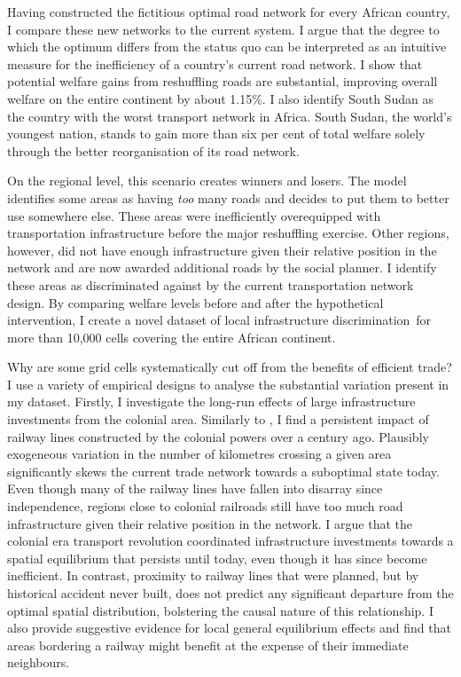 \documentclass[11pt, oneside]{article}   	%
\begin{document}
Having constructed the fictitious optimal road network for every African country, I compare these new networks to the current system. I argue that the degree to which the optimum differs from the status quo can be interpreted as an intuitive measure for the inefficiency of a country's current road network. I show that potential welfare gains from reshuffling roads are substantial, improving overall welfare on the entire continent by about 1.15\%. I also identify South Sudan as the country with the worst transport network in Africa. South Sudan, the world's youngest nation, stands to gain more than six per cent of total welfare solely through the better reorganisation of its road network.

On the regional level, this scenario creates winners and losers. The model identifies some areas as having \emph{too} many roads and decides to put them to better use somewhere else. These areas were inefficiently overequipped with transportation infrastructure before the major reshuffling exercise. Other regions, however, did not have enough infrastructure given their relative position in the network and are now awarded additional roads by the social planner. I identify these areas as discriminated against by the current transportation network design. By comparing welfare levels before and after the hypothetical intervention, I create a novel dataset of local infrastructure discrimination for more than 10,000 cells covering the entire African continent.

Why are some grid cells systematically cut off from the benefits of efficient trade? I use a variety of empirical designs to analyse the substantial variation present in my dataset. Firstly, I investigate the long-run effects of large infrastructure investments from the colonial area. Similarly to \cite{Jedwab_PermanentEffectsTransportation_2016a}, I find a persistent impact of railway lines constructed by the colonial powers over a century ago. Plausibly exogeneous variation in the number of kilometres crossing a given area significantly skews the current trade network towards a suboptimal state today. Even though many of the railway lines have fallen into disarray since independence, regions close to colonial railroads still have too much road infrastructure given their relative position in the network. I argue that the colonial era transport revolution coordinated infrastructure investments towards a spatial equilibrium that persists until today, even though it has since become inefficient. In contrast, proximity to railway lines that were planned, but by historical accident never built, does not predict any significant departure from the optimal spatial distribution, bolstering the causal nature of this relationship. I also provide suggestive evidence for local general equilibrium effects and find that areas bordering a railway might benefit at the expense of their immediate neighbours.
\end{document}
